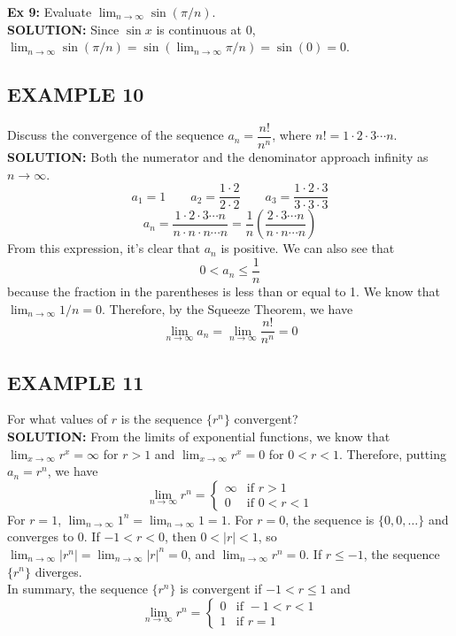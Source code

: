 \documentclass{article}
\theoremstyle{mystyle}
\begin{document}
\textbf{Ex 9:} Evaluate \(\lim_{n\to\infty} \sin(\pi/n)\).\\
 \textbf{SOLUTION:} Since \(\sin x\) is continuous at 0, \(\lim_{n\to\infty} \sin(\pi/n) = \sin(\lim_{n\to\infty} \pi/n) = \sin(0) = 0\).

\subsection*{EXAMPLE 10}
 Discuss the convergence of the sequence \(a_n = \dfrac{n!}{n^n}\), where \(n! = 1 \cdot 2 \cdot 3 \cdots n\).\\
\textbf{SOLUTION:}
 Both the numerator and the denominator approach infinity as \(n \to \infty\).
 \[ a_1 = 1 \qquad a_2 = \frac{1 \cdot 2}{2 \cdot 2} \qquad a_3 = \frac{1 \cdot 2 \cdot 3}{3 \cdot 3 \cdot 3} \]
 \[ a_n = \frac{1 \cdot 2 \cdot 3 \cdots n}{n \cdot n \cdot n \cdots n} = \frac{1}{n} \left( \frac{2 \cdot 3 \cdots n}{n \cdot n \cdots n} \right) \]
 From this expression, it's clear that \(a_n\) is positive. We can also see that
 \[ 0 < a_n \le \frac{1}{n} \]
 because the fraction in the parentheses is less than or equal to 1. We know that \(\lim_{n\to\infty} 1/n = 0\). Therefore, by the Squeeze Theorem, we have
 \[ \lim_{n\to\infty} a_n = \lim_{n\to\infty} \frac{n!}{n^n} = 0 \]
 
\subsection*{EXAMPLE 11}
 For what values of \(r\) is the sequence \(\{r^n\}\) convergent?\\
\textbf{SOLUTION:}
 From the limits of exponential functions, we know that \(\lim_{x\to\infty} r^x = \infty\) for \(r>1\) and \(\lim_{x\to\infty} r^x = 0\) for \(0 < r < 1\). Therefore, putting \(a_n = r^n\), we have
 \[ \lim_{n\to\infty} r^n = \begin{cases} \infty & \text{if } r > 1 \\ 0 & \text{if } 0 < r < 1 \end{cases} \]
 For \(r=1\), \(\lim_{n\to\infty} 1^n = \lim_{n\to\infty} 1 = 1\).
 For \(r=0\), the sequence is \(\{0, 0, \dots\}\) and converges to 0.
 If \(-1 < r < 0\), then \(0 < |r| < 1\), so \(\lim_{n\to\infty} |r^n| = \lim_{n\to\infty} |r|^n = 0\), and \(\lim_{n\to\infty} r^n = 0\).
 If \(r \le -1\), the sequence \(\{r^n\}\) diverges.\\
 In summary, the sequence \(\{r^n\}\) is convergent if \(-1 < r \le 1\) and \[ \lim_{n\to\infty} r^n = \begin{cases} 0 & \text{if } -1 < r < 1 \\ 1 & \text{if } r = 1 \end{cases} \]
\end{document}

